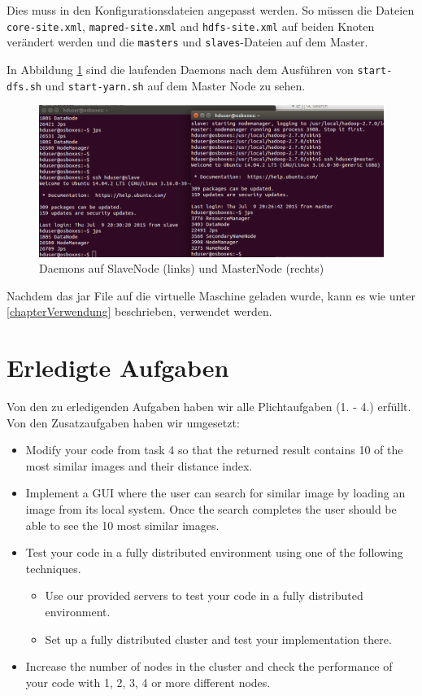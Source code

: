 \documentclass[paper=a4, fontsize=11pt]{scrartcl} %
\numberwithin{equation}{section} %
\numberwithin{figure}{section} %
\numberwithin{table}{section} %
\begin{document}
Dies muss in den Konfigurationsdateien angepasst werden. So müssen die Dateien \lstinline$core-site.xml$, \lstinline$mapred-site.xml$ and \lstinline$hdfs-site.xml$ auf beiden Knoten verändert werden und die \lstinline$masters$ und \lstinline$slaves$-Dateien auf dem Master.

In Abbildung \ref{fig:s4} sind die laufenden Daemons nach dem Ausführen von \lstinline$start-dfs.sh$ und \lstinline$start-yarn.sh$ auf dem Master Node zu sehen. 

\begin{figure}[H]
\begin{center}
	\includegraphics[width=\textwidth]{images/screen4}
	\caption{Daemons auf SlaveNode (links) und MasterNode (rechts)}
	\label{fig:s4}
\end{center}
\end{figure}

Nachdem das jar File auf die virtuelle Maschine geladen wurde, kann es wie unter \ref{chapterVerwendung} beschrieben, verwendet werden.

\section{Erledigte Aufgaben}
Von den zu erledigenden Aufgaben haben wir alle Plichtaufgaben (1. - 4.) erfüllt. Von den Zusatzaufgaben haben wir umgesetzt:

\begin{itemize}
\item Modify your code from task 4 so that the returned result contains 10 of the most similar images and their distance index.
\item Implement a GUI where the user can search for similar image by loading an image
from its local system. Once the search completes the user should be able to see the
10 most similar images.
\item Test your code in a fully distributed environment using one of the following
techniques.
	\begin{itemize}
	\item Use our provided servers to test your code in a fully distributed environment.
	\item Set up a fully distributed cluster and test your implementation there.
	\end{itemize}
\item Increase the number of nodes in the cluster and check the performance of your code
with 1, 2, 3, 4 or more different nodes.
\end{itemize}
\end{document}
